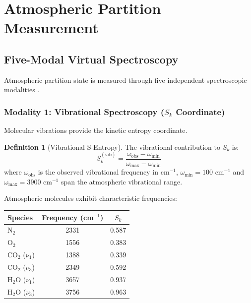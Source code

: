 \documentclass[twocolumn,10pt,a4paper]{article}
\theoremstyle{definition}
\newtheorem{definition}[theorem]{Definition}
\theoremstyle{remark}
\begin{document}
\section{Atmospheric Partition Measurement}
\label{sec:measurement}

\subsection{Five-Modal Virtual Spectroscopy}

Atmospheric partition state is measured through five independent spectroscopic modalities \cite{herzberg1945molecular,atkins2010molecular}.

\subsubsection{Modality 1: Vibrational Spectroscopy ($S_k$ Coordinate)}

Molecular vibrations provide the kinetic entropy coordinate.

\begin{definition}[Vibrational S-Entropy]
\label{def:vib_entropy}
The vibrational contribution to $S_k$ is:
\begin{equation}
    S_k^{(\text{vib})} = \frac{\omega_{\text{obs}} - \omega_{\min}}{\omega_{\max} - \omega_{\min}}
\end{equation}
where $\omega_{\text{obs}}$ is the observed vibrational frequency in cm$^{-1}$, $\omega_{\min} = 100$ cm$^{-1}$ and $\omega_{\max} = 3900$ cm$^{-1}$ span the atmospheric vibrational range.
\end{definition}

Atmospheric molecules exhibit characteristic frequencies:
\begin{center}
\begin{tabular}{lcc}
\toprule
Species & Frequency (cm$^{-1}$) & $S_k$ \\
\midrule
N$_2$ & 2331 & 0.587 \\
O$_2$ & 1556 & 0.383 \\
CO$_2$ ($\nu_1$) & 1388 & 0.339 \\
CO$_2$ ($\nu_3$) & 2349 & 0.592 \\
H$_2$O ($\nu_1$) & 3657 & 0.937 \\
H$_2$O ($\nu_3$) & 3756 & 0.963 \\
\bottomrule
\end{tabular}
\end{center}
\end{document}
